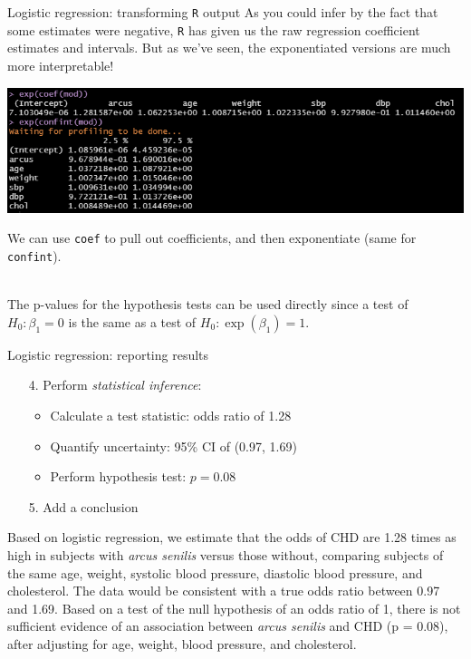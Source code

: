 \documentclass[10pt,t]{beamer}
\begin{document}
\begin{frame}{Logistic regression: transforming \texttt{R} output}
	As you could infer by the fact that some estimates were negative, \texttt{R} has given us the raw regression coefficient estimates and intervals. But as we've seen, the exponentiated versions are much more interpretable!
			\begin{center}
		\includegraphics[width=\textwidth]{./figs/multiple_logistic_regression_arcus_exp}
	\end{center}
	We can use \texttt{coef} to pull out coefficients, and then exponentiate (same for \texttt{confint}).
	\\ ~\
	
	The p-values for the hypothesis tests can be used directly since a test of $H_0: \beta_1 = 0$ is the same as a test of $H_0: \exp(\beta_1) = 1$. 
\end{frame}

\begin{frame}{Logistic regression: reporting results}
	\begin{enumerate}
		\item[4.] Perform \textit{statistical inference}:
		\begin{itemize}
			\item Calculate a test statistic: odds ratio of 1.28
			\item Quantify uncertainty: 95\% CI of (0.97, 1.69)
			\item Perform hypothesis test: $p = 0.08$
		\end{itemize}
		\item[5.] Add a conclusion
	\end{enumerate}
	Based on logistic regression, we estimate that the odds of CHD are 1.28 times as high in subjects with \textit{arcus senilis} versus those without, comparing subjects of the same age, weight, systolic blood pressure, diastolic blood pressure, and cholesterol. The data would be consistent with a true odds ratio between 0.97 and 1.69. Based on a test of the null hypothesis of an odds ratio of 1, there is not sufficient evidence of an association between \textit{arcus senilis} and CHD (p = 0.08), after adjusting for age, weight, blood pressure, and cholesterol. 
\end{frame}
\end{document}
